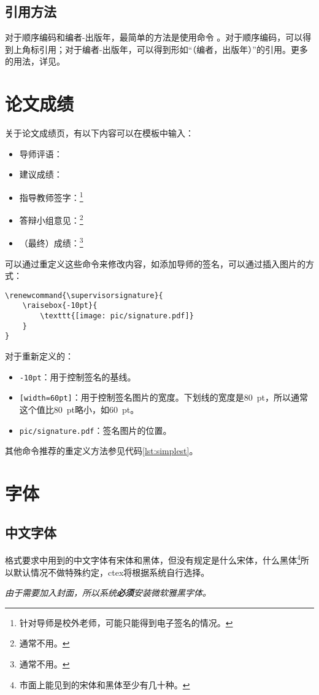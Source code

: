 \documentclass[oneside]{LZU}
\newenvironment{note}{\par\itshape\noindent{\makebox[-5pt][r]{\scriptsize\color{red!90}\textdbend\quad}}}{\par}
\newcommand{\package}[1]{{\sffamily #1}}
\begin{document}
\subsection{引用方法}
对于顺序编码和编者-出版年，最简单的方法是使用\texttt{\autocite{key}}命令
。对于顺序编码，可以得到上角标引用；对于编者-出版年，可以得到形如“（编者，出版年）”的引用。更多的用法，详见\cite[文献][]{biblatex-gbt,caspervector}。

\section{论文成绩}
关于论文成绩页，有以下内容可以在模板中输入：
\begin{itemize}
    \item 导师评语：\texttt{\supervisorcomment}
    \item 建议成绩：\texttt{\recommendedgrade}
    \item 指导教师签字：\texttt{\supervisorsignature}\footnote{针对导师是校外老师，可能只能得到电子签名的情况。}
    \item 答辩小组意见：\texttt{\committeecomment}\footnote{通常不用。}
    \item （最终）成绩：\texttt{\finalgrade}\footnote{通常不用。}
\end{itemize}
可以通过重定义这些命令来修改内容，如添加导师的签名，可以通过插入图片的方式：
\begin{verbatim}
\renewcommand{\supervisorsignature}{
    \raisebox{-10pt}{
        \texttt{[image: pic/signature.pdf]}
    }
}
\end{verbatim}
对于重新定义的\texttt{\supervisorsignature}：
\begin{itemize}
    \item \texttt{{-10pt}}：用于控制签名的基线。
    \item \texttt{[width=60pt]}：用于控制签名图片的宽度。下划线的宽度是\SI{80}{pt}，所以通常这个值比\SI{80}{pt}略小，如\SI{60}{pt}。
    \item \texttt{pic/signature.pdf}：签名图片的位置。
\end{itemize}
其他命令推荐的重定义方法参见代码\ref{lst:simplest}。
\section{字体}
\subsection{中文字体}
格式要求中用到的中文字体有宋体和黑体，但没有规定是什么宋体，什么黑体\footnote{市面上能见到的宋体和黑体至少有几十种。}所以默认情况不做特殊约定，\package{ctex}将根据系统自行选择。
\begin{note}
    由于需要加入封面，所以系统{\bf 必须}安装微软雅黑字体。
\end{note}
\end{document}
